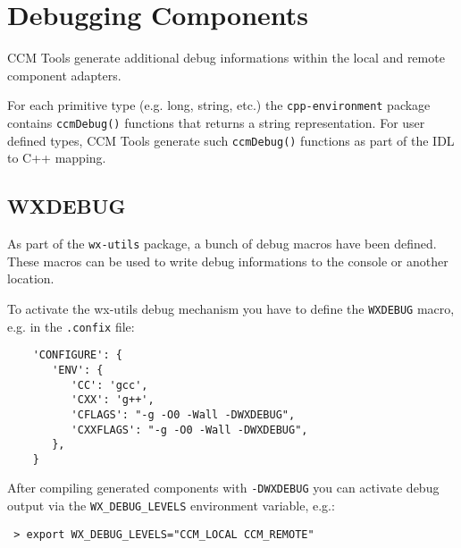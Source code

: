 \chapter{Debugging Components}

CCM Tools generate additional debug informations within the local and
remote component adapters.

For each primitive type (e.g. long, string, etc.)
the {\tt cpp-environment} package contains {\tt ccmDebug()} 
functions that returns a string representation.
For user defined types, CCM Tools generate such {\tt ccmDebug()}
functions as part of the IDL to C++ mapping.   


\section{WXDEBUG}

As part of the {\tt wx-utils} package, a bunch of debug macros have been
defined. These macros can be used to write debug informations to the console
or another location.

To activate the wx-utils debug mechanism you have to define the {\tt WXDEBUG} 
macro, e.g. in the {\tt .confix} file:
\begin{verbatim} 
    'CONFIGURE': {
       'ENV': {
          'CC': 'gcc',
          'CXX': 'g++',      
          'CFLAGS': "-g -O0 -Wall -DWXDEBUG",
          'CXXFLAGS': "-g -O0 -Wall -DWXDEBUG",
       },
    }
\end{verbatim} 

After compiling generated components with {\tt -DWXDEBUG} you can activate
debug output via the {\tt WX\_DEBUG\_LEVELS} environment variable, e.g.:
\begin{verbatim} 
 > export WX_DEBUG_LEVELS="CCM_LOCAL CCM_REMOTE"
\end{verbatim} 

